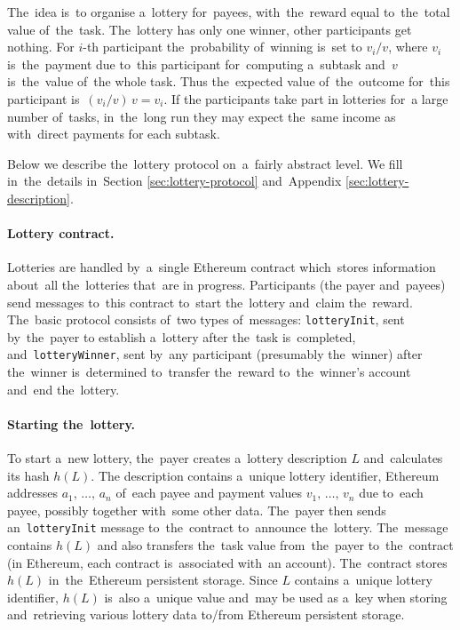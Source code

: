 \documentclass[a4paper]{article}
\newcommand{\lotteryhash}[1]{h({#1})}
\begin{document}
    The~idea is~to organise a~lottery for~payees, with~the~reward equal to~the~total value of~the~task. The~lottery
    has only one winner, other participants get nothing. For $i$-th participant the~probability of~winning is~set to
    $v_i/v$, where $v_i$ is~the~payment due to~this participant for~computing a~subtask and~$v$ is~the~value of~the
    whole task. Thus the~expected value of~the~outcome for~this participant is~$(v_i/v)\,v = v_i$. If the participants
    take part in lotteries for~a large number of~tasks, in~the~long run they may expect the~same income as with~direct
    payments for each subtask.

    Below we describe the~lottery protocol on~a~fairly abstract level. We fill in~the~details in~Section
    \ref{sec:lottery-protocol} and~Appendix \ref{sec:lottery-description}.
    
    \paragraph{Lottery contract.}
    Lotteries are handled by~a~single Ethereum contract which~stores information about~all the~lotteries that~are in
    progress. Participants (the payer and~payees) send messages to~this contract to~start the~lottery and~claim
    the~reward. The~basic protocol consists of~two types of~messages: \texttt{lotteryInit}, sent by~the~payer to
    establish a~lottery after the~task is~completed, and~\texttt{lotteryWinner}, sent by~any participant
    (presumably the~winner) after the~winner is~determined to~transfer the~reward to~the~winner's account and~end
    the~lottery.

    \paragraph{Starting the~lottery.}
    To start a~new lottery, the~payer creates a~lottery description $L$ and~calculates its hash $\lotteryhash{L}$. The
    description contains a~unique lottery identifier, Ethereum addresses $a_1,\,\ldots,\,a_n$ of~each payee and
    payment values $v_1,\,\ldots,\,v_n$ due to~each payee, possibly together with~some other data. The~payer then
    sends an~\texttt{lotteryInit} message to~the~contract to~announce the~lottery. The~message contains $\lotteryhash{L}$ and
    also transfers the~task value from~the~payer to~the~contract (in Ethereum, each contract is~associated with~an
    account). The~contract stores $\lotteryhash{L}$ in~the~Ethereum persistent storage. Since $L$ contains a~unique lottery
    identifier, $\lotteryhash{L}$ is~also a~unique value and~may be used as a~key when storing and~retrieving various lottery
    data to/from Ethereum persistent storage.
\end{document}
